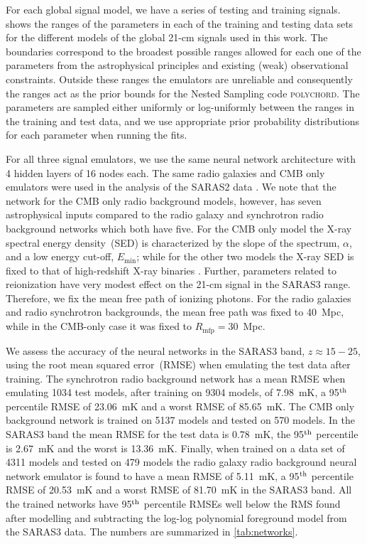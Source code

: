 For each global signal model, we have a series of testing and training signals.  shows the ranges of the parameters in each of the training and testing data sets for the different models of the global 21-cm signals used in this work. The boundaries correspond to the broadest possible ranges allowed for each one of the parameters from the astrophysical principles and existing (weak) observational constraints. Outside these ranges the emulators are unreliable and consequently the ranges act as the prior bounds for the Nested Sampling code \textsc{polychord}. The parameters are sampled either uniformly or log-uniformly between the ranges in the training and test data, and we use appropriate prior probability distributions for each parameter when running the fits.

For all three signal emulators, we use the same neural network architecture with 4 hidden layers of 16 nodes each. The same radio galaxies and CMB only emulators were used in the analysis of the SARAS2 data \citep[e.g. \cref{ch:saras2},][]{Bevins_SARAS2_2022}. We note that the network for the CMB only radio background models, however, has seven astrophysical inputs compared to the radio galaxy and synchrotron radio background networks which both have five. For the CMB only model the X-ray spectral energy density~(SED) is characterized by the slope of the spectrum, $\alpha$, and a low energy cut-off, $E_\mathrm{min}$; while  for the other two models the X-ray SED is fixed to that of high-redshift X-ray binaries \cite{Fragos_Xrays_2013}. Further, parameters related to reionization have very modest effect on the 21-cm signal in the SARAS3 range. Therefore, we fix the mean free path of ionizing photons. For the radio galaxies and radio synchrotron backgrounds, the mean free path was fixed to 40~Mpc, while in the CMB-only case it was fixed to  $R_\mathrm{mfp} = 30$~Mpc. 

We assess the accuracy of the neural networks in the SARAS3 band, $z \approx 15 - 25$, using the root mean squared error~(RMSE) when emulating the test data after training. The synchrotron radio background network has a mean RMSE when emulating 1034 test models, after training on 9304 models, of 7.98~mK, a 95$\textsuperscript{th}$ percentile RMSE of 23.06~mK and a worst RMSE of 85.65~mK. The CMB only background network is trained on 5137 models and tested on 570 models. In the SARAS3 band the mean RMSE for the test data is 0.78~mK, the 95$\textsuperscript{th}$ percentile is 2.67~mK and the worst is 13.36~mK. Finally, when trained on a data set of 4311 models and tested on 479 models the radio galaxy radio background neural network emulator is found to have a mean RMSE of 5.11~mK, a 95$\textsuperscript{th}$ percentile RMSE of 20.53~mK and a worst RMSE of 81.70~mK in the SARAS3 band. All the trained networks have 95$\textsuperscript{th}$ percentile RMSEs well below the RMS found after modelling and subtracting the log-log polynomial foreground model from the SARAS3 data. The numbers are summarized in \cref{tab:networks}.

